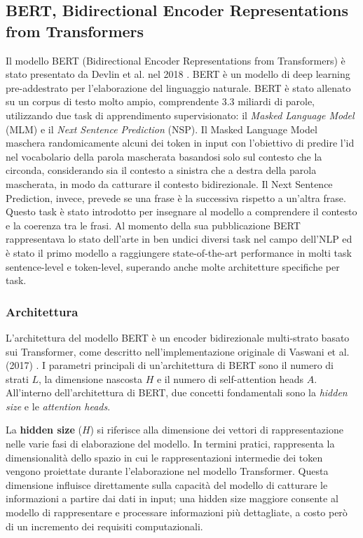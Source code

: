 \documentclass[../../Thesis.tex]{subfiles}
\begin{document}
\subsection{BERT, Bidirectional Encoder Representations from Transformers}
Il modello BERT (Bidirectional Encoder Representations from Transformers) è stato presentato da Devlin et al. nel 2018 \cite{BERT}. BERT è un modello di deep learning pre-addestrato per l'elaborazione del linguaggio naturale. BERT è stato allenato su un corpus di testo molto ampio, comprendente 3.3 miliardi di parole, utilizzando due task di apprendimento supervisionato: il \emph{Masked Language Model} (MLM) e il \emph{Next Sentence Prediction} (NSP). Il Masked Language Model maschera randomicamente alcuni dei token in input con l'obiettivo di predire l'id nel vocabolario della parola mascherata basandosi solo sul contesto che la circonda, considerando sia il contesto a sinistra che a destra della parola mascherata, in modo da catturare il contesto bidirezionale. Il Next Sentence Prediction, invece, prevede se una frase è la successiva rispetto a un'altra frase. Questo task è stato introdotto per insegnare al modello a comprendere il contesto e la coerenza tra le frasi. Al momento della sua pubblicazione BERT rappresentava lo stato dell'arte in ben undici diversi task nel campo dell'NLP ed è stato il primo modello a raggiungere state-of-the-art performance in molti task sentence-level e token-level, superando anche molte architetture specifiche per task. 

\subsubsection{Architettura}
L'architettura del modello BERT è un encoder bidirezionale multi-strato basato sui Transformer, come descritto nell'implementazione originale di Vaswani et al. (2017) \cite{AttentionIsAllYouNeed}. I parametri principali di un'architettura di BERT sono il numero di strati $L$, la dimensione nascosta $H$ e il numero di self-attention heads $A$. All'interno dell'architettura di BERT, due concetti fondamentali sono la \textit{hidden size} e le \textit{attention heads}.

La \textbf{hidden size} ($H$) si riferisce alla dimensione dei vettori di rappresentazione nelle varie fasi di elaborazione del modello. In termini pratici, rappresenta la dimensionalità dello spazio in cui le rappresentazioni intermedie dei token vengono proiettate durante l'elaborazione nel modello Transformer. Questa dimensione influisce direttamente sulla capacità del modello di catturare le informazioni a partire dai dati in input; una hidden size maggiore consente al modello di rappresentare e processare informazioni più dettagliate, a costo però di un incremento dei requisiti computazionali.
\end{document}
